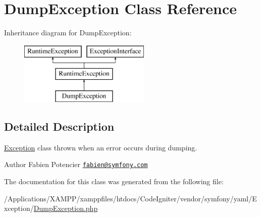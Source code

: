 \hypertarget{class_symfony_1_1_component_1_1_yaml_1_1_exception_1_1_dump_exception}{}\section{Dump\+Exception Class Reference}
\label{class_symfony_1_1_component_1_1_yaml_1_1_exception_1_1_dump_exception}
Inheritance diagram for Dump\+Exception\+:\begin{figure}[H]
\begin{center}
\leavevmode
\includegraphics[height=3.000000cm]{class_symfony_1_1_component_1_1_yaml_1_1_exception_1_1_dump_exception}
\end{center}
\end{figure}


\subsection{Detailed Description}
\mbox{\hyperlink{namespace_symfony_1_1_component_1_1_yaml_1_1_exception}{Exception}} class thrown when an error occurs during dumping.

\begin{DoxyAuthor}{Author}
Fabien Potencier \href{mailto:fabien@symfony.com}{\tt fabien@symfony.\+com} 
\end{DoxyAuthor}


The documentation for this class was generated from the following file\+:\begin{DoxyCompactItemize}
\item 
/\+Applications/\+X\+A\+M\+P\+P/xamppfiles/htdocs/\+Code\+Igniter/vendor/symfony/yaml/\+Exception/\mbox{\hyperlink{_dump_exception_8php}{Dump\+Exception.\+php}}\end{DoxyCompactItemize}
